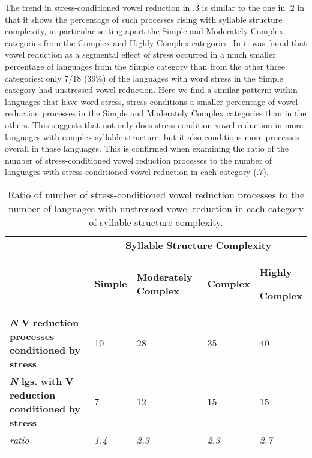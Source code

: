   The trend in stress-conditioned vowel reduction in .3 is similar to the one in .2 in that it shows the percentage of such processes rising with syllable structure complexity, in particular setting apart the Simple and Moderately Complex categories from the Complex and Highly Complex categories. In  it was found that vowel reduction as a segmental effect of stress occurred in a much smaller percentage of languages from the Simple category than from the other three categories: only 7/18 (39\%) of the languages with word stress in the Simple category had unstressed vowel reduction. Here we find a similar pattern: within languages that have word stress, stress conditions a smaller percentage of vowel reduction processes in the Simple and Moderately Complex categories than in the others. This suggests that not only does stress condition vowel reduction in more languages with complex syllable structure, but it also conditions more processes overall in those languages. This is confirmed when examining the ratio of the number of stress-conditioned vowel reduction processes to the number of languages with stress-conditioned vowel reduction in each category (.7).

\begin{table}
\begin{tabularx}{\textwidth}{XXXXX}
\lsptoprule
 & \multicolumn{4}{c}{ \textbf{Syllable} \textbf{Structure} \textbf{Complexity}}\\
& \textbf{Simple} & \textbf{Moderately} \textbf{Complex} & \textbf{Complex} & { \textbf{Highly} }

 \textbf{Complex}\\
 \textbf{\textit{N}} \textbf{V} \textbf{reduction} \textbf{processes} \textbf{conditioned} \textbf{by} \textbf{stress} & 10 & 28 & 35 & 40\\
 \textbf{\textit{N}} \textbf{lgs.} \textbf{with} \textbf{V} \textbf{reduction} \textbf{conditioned} \textbf{by} \textbf{stress} & 7 & 12 & 15 & 15\\
 \textit{ratio} & \textit{1.4} & \textit{2.3} & \textit{2.3} & \textit{2.7}\\
\lspbottomrule
\end{tabularx}
\caption{\label{6.7}Ratio of number of stress-conditioned vowel reduction processes to the number of languages with unstressed vowel reduction in each category of syllable structure complexity.}
\end{table}

